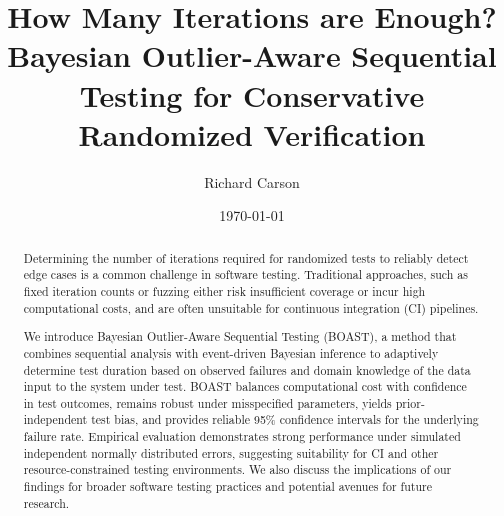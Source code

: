 \documentclass[12pt]{article}
\title{How Many Iterations are Enough? Bayesian Outlier-Aware Sequential Testing for Conservative Randomized Verification}
\author{Richard Carson}
\date{\today}
\begin{document}
    \maketitle

    \begin{abstract}
        Determining the number of iterations required for randomized tests to reliably detect edge cases is a common challenge in software testing. Traditional approaches, such as fixed iteration counts or fuzzing either risk insufficient coverage or incur high computational costs, and are often unsuitable for continuous integration (CI) pipelines.

        We introduce Bayesian Outlier-Aware Sequential Testing (BOAST), a method that combines sequential analysis with event-driven Bayesian inference to adaptively determine test duration based on observed failures and domain knowledge of the data input to the system under test. BOAST balances computational cost with confidence in test outcomes, remains robust under misspecified parameters, yields prior-independent test bias, and provides reliable 95\% confidence intervals for the underlying failure rate. Empirical evaluation demonstrates strong performance under simulated independent normally distributed errors, suggesting suitability for CI and other resource-constrained testing environments. We also discuss the implications of our findings for broader software testing practices and potential avenues for future research.
    \end{abstract}

    \newpage

    
    
    
    
    
    
    
\end{document}
